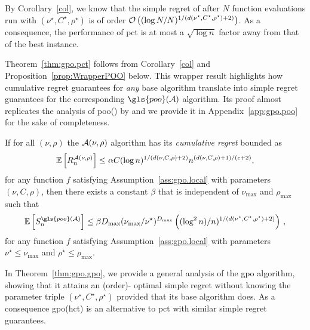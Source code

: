By Corollary~\ref{col}, we know that the simple regret of \HCT after $N$ function evaluations run with $(\nu^\star,C^\star,\rho^\star)$ is of order $\mathcal{O}\left( (\log N/N)^{1/(d(\nu^{\star},C^\star,\rho^{\star})+2)} \right)$. As a consequence, the performance of \gls{pct} is at most a $\sqrt{\log n}$ factor away from that of the best \HCT instance.

Theorem~\ref{thm:gpo.pct} follows from Corollary~\ref{col} and Proposition~\ref{prop:WrapperPOO} below. This wrapper result highlights how cumulative regret guarantees for \emph{any} base algorithm translate into simple regret guarantees for the corresponding $\gls{poo}(\cA)$ algorithm. Its proof almost replicates the analysis of \gls{poo}{}(\HOO) by \cite{grill2015poo} and we provide it in Appendix~\ref{app:gpo.poo} for the sake of completeness.  

\begin{proposition}\label{prop:WrapperPOO}
\begin{leftbar}[propositionbar]
If for all $(\nu,\rho)$ the $\mathcal{A}(\nu,\rho)$ algorithm has its \emph{cumulative regret} bounded as
\begin{equation}
    \mathbb{E}\left[R_n^{\mathcal{A}(\nu,\rho)}\right] \leq \alpha C(\log n)^{1/(d(\nu,C,\rho)+2)}n^{(d(\nu,C,\rho)+1)/(c+2)},\label{centralConditionPOO}
\end{equation}
for any function $f$ satisfying Assumption~\ref{ass:gpo.local} with parameters $(\nu,C,\rho)$, then there exists a constant $\beta$ that is independent of $\nu_{\max}$ and $\rho_{\max}$ such that 
\[
    \mathbb{E}\left[S_n^{\gls{poo}(\cA)}\right]  \leq \beta D_{\max}(\nu_{\max}/\nu^\star)^{D_{\max}} \left( (\log^2 n)/n)^{1/(d(\nu^\star,C^\star,\rho^\star)+2)} \right)\,,
\]
for any function $f$ satisfying Assumption~\ref{ass:gpo.local} with parameters $\nu^\star \leq \nu_{\max}$ and $\rho^\star\leq \rho_{\max}$.
\end{leftbar}
\end{proposition}


In Theorem~\ref{thm:gpo.gpo}, we provide a general analysis of the \gls{gpo} algorithm, showing that it attains an (order)-
optimal simple regret without knowing the parameter triple $(\nu^\star,C^\star,\rho^\star)$ provided that its base algorithm does. As a consequence \gls{gpo}(\gls{hct}) is an alternative to \gls{pct} with similar simple regret guarantees.
